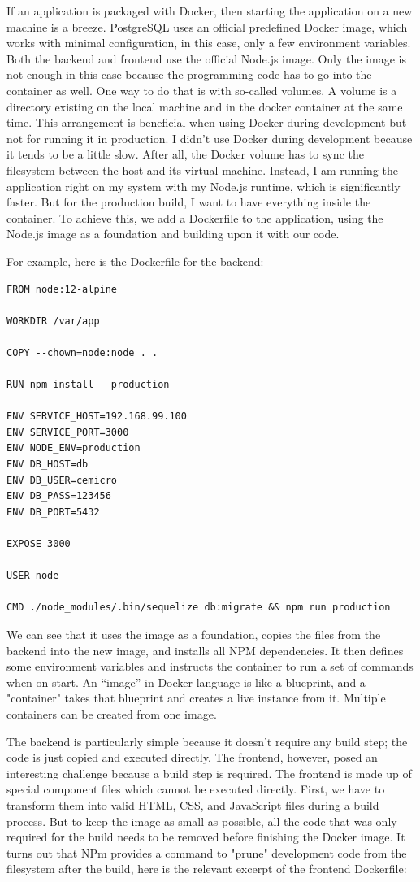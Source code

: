 If an application is packaged with Docker, then starting the application on a new machine is a breeze. PostgreSQL uses an official predefined Docker image, which works with minimal configuration, in this case, only a few environment variables. Both the backend and frontend use the official Node.js image. Only the image is not enough in this case because the programming code has to go into the container as well. One way to do that is with so-called volumes. A volume is a directory existing on the local machine and in the docker container at the same time. This arrangement is beneficial when using Docker during development but not for running it in production. I didn't use Docker during development because it tends to be a little slow. After all, the Docker volume has to sync the filesystem between the host and its virtual machine. Instead, I am running the application right on my system with my Node.js runtime, which is significantly faster. But for the production build, I want to have everything inside the container. To achieve this, we add a Dockerfile to the application, using the Node.js image as a foundation and building upon it with our code.

For example, here is the Dockerfile for the backend:

\begin{lstlisting}[belowskip=-1]
FROM node:12-alpine

WORKDIR /var/app

COPY --chown=node:node . .

RUN npm install --production

ENV SERVICE_HOST=192.168.99.100
ENV SERVICE_PORT=3000
ENV NODE_ENV=production
ENV DB_HOST=db
ENV DB_USER=cemicro
ENV DB_PASS=123456
ENV DB_PORT=5432

EXPOSE 3000

USER node

CMD ./node_modules/.bin/sequelize db:migrate && npm run production
\end{lstlisting}

We can see that it uses the  image as a foundation, copies the files from the backend into the new image, and installs all NPM dependencies. It then defines some environment variables and instructs the container to run a set of commands when on start. An "`image"' in Docker language is like a blueprint, and a "container" takes that blueprint and creates a live instance from it. Multiple containers can be created from one image.

The backend is particularly simple because it doesn't require any build step; the code is just copied and executed directly. The frontend, however, posed an interesting challenge because a build step is required. The frontend is made up of special  component files which cannot be executed directly. First, we have to transform them into valid HTML, CSS, and JavaScript files during a build process. But to keep the image as small as possible, all the code that was only required for the build needs to be removed before finishing the Docker image. It turns out that NPm provides a command to "prune" development code from the filesystem after the build, here is the relevant excerpt of the frontend Dockerfile:

